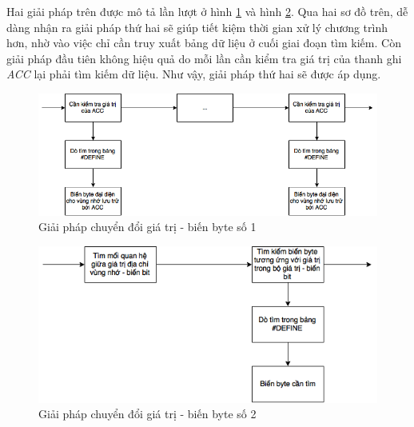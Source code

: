Hai giải pháp trên được mô tả lần lượt ở hình \ref{fig:waytotransfer1} và hình \ref{fig:waytotransfer2}. Qua hai sơ đồ trên, dễ dàng nhận ra giải pháp thứ hai sẽ giúp tiết kiệm thời gian xử lý chương trình hơn, nhờ vào việc chỉ cần truy xuất bảng dữ liệu ở cuối giai đoạn tìm kiếm. Còn giải pháp đầu tiên không hiệu quả do mỗi lần cần kiểm tra giá trị của thanh ghi \textit{ACC} lại phải tìm kiếm dữ liệu. Như vậy, giải pháp thứ hai sẽ được áp dụng.
\begin{figure} [h!]
	\centering
	\includegraphics[width=0.7\linewidth]{image/wayToTransfer1}
	\caption{Giải pháp chuyển đổi giá trị - biến byte số 1}
	\label{fig:waytotransfer1}
\end{figure}
\begin{figure}[h!]
	\centering
	\includegraphics[width=0.7\linewidth]{image/wayToTransfer2}
	\caption{Giải pháp chuyển đổi giá trị - biến byte số 2}
	\label{fig:waytotransfer2}
\end{figure}
